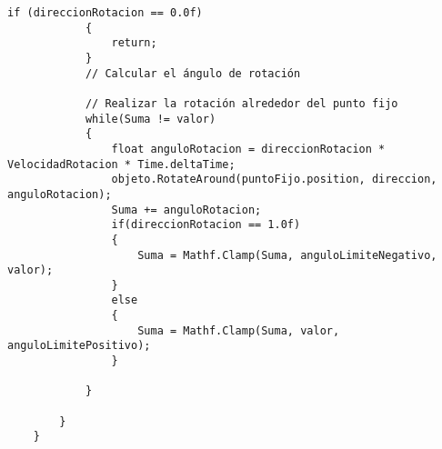 \begin{lstlisting}[frame=single]
            if (direccionRotacion == 0.0f)
            {
                return;
            }
            // Calcular el ángulo de rotación
            
            // Realizar la rotación alrededor del punto fijo
            while(Suma != valor)
            {
                float anguloRotacion = direccionRotacion * VelocidadRotacion * Time.deltaTime;
                objeto.RotateAround(puntoFijo.position, direccion, anguloRotacion);
                Suma += anguloRotacion;
                if(direccionRotacion == 1.0f)
                {
                    Suma = Mathf.Clamp(Suma, anguloLimiteNegativo, valor);
                }
                else
                {
                    Suma = Mathf.Clamp(Suma, valor, anguloLimitePositivo);
                }
                
            }
            
        }
    }
\end{lstlisting}